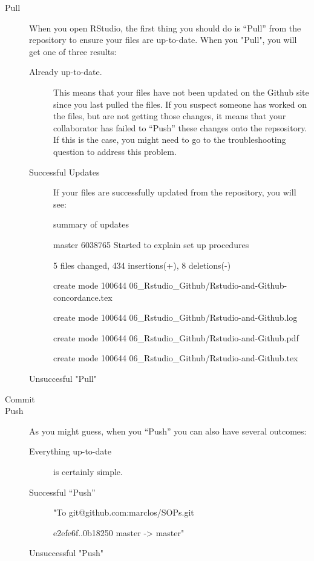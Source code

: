 \documentclass[12pt]{../SOP4_alpha}\usepackage[]{graphicx}\usepackage[]{color}
\begin{document}
\begin{description}
  \item[Pull] When you open RStudio, the first thing you should do is ``Pull'' from the repository to ensure your files are up-to-date. When you "Pull", you will get one of three results:
  
  \begin{description}
  \item[Already up-to-date.] This means that your files have not been updated on the Github site since you last pulled the files. If you suspect someone has worked on the files, but are not getting those changes, it means that your collaborator has failed to ``Push'' these changes onto the repsository. If this is the case, you might need to go to the troubleshooting question to address this problem.
  
  \item[Successful Updates] If your files are successfully updated from the repository, you will see:
  
summary of updates

master 6038765 Started to explain set up procedures
 
 5 files changed, 434 insertions(+), 8 deletions(-)
 
 create mode 100644 06\_Rstudio\_Github/Rstudio-and-Github-concordance.tex
 
 create mode 100644 06\_Rstudio\_Github/Rstudio-and-Github.log
 
 create mode 100644 06\_Rstudio\_Github/Rstudio-and-Github.pdf
 
 create mode 100644 06\_Rstudio\_Github/Rstudio-and-Github.tex
 
 \item[Unsuccesful "Pull"]
 
 
\end{description}

  \item[Commit]
  \item[Push] As you might guess, when you ``Push'' you can also have several outcomes:
\begin{description}
  \item[Everything up-to-date] is certainly simple.   \item[Successful ``Push'']
  
    "To git@github.com:marclos/SOPs.git
  
   e2efe6f..0b18250  master -> master"
   \item[Unsuccessful "Push"]
\end{description}
  

\end{description}
\end{document}
